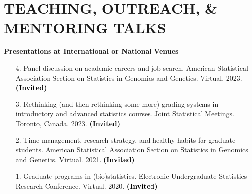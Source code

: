 \documentclass[margin]{res}
\newenvironment{benumerate}[1]{
    \let\oldItem\item
    \def\item{\addtocounter{enumi}{-2}\oldItem}
    
    \begin{enumerate}
    \setcounter{enumi}{#1}
    \addtocounter{enumi}{1}
}{
    \end{enumerate}
}
\newcommand{\annotate}[1]{\textcolor{black}{\textbf{(#1)}}}
\newcommand{\annotateItem}[1]{
	\begin{itemize} \vspace{-0.1cm}
	\item[] 
	\begin{footnotesize}\textcolor{black}{(#1)}\end{footnotesize}
	\end{itemize} \vspace{-0.1cm}
}
\begin{document}
\begin{resume}
\begin{itemize}
\end{itemize}




\section{TEACHING, OUTREACH, \& MENTORING  TALKS}

\textbf{Presentations at International or National Venues}

\begin{itemize}

\item[4.] Panel discussion on academic careers and job search. 
American Statistical Association Section on Statistics in Genomics and Genetics. Virtual. 2023. 
\annotate{Invited}

\item[3.] Rethinking (and then rethinking some more) grading systems in introductory and advanced statistics courses. 
Joint Statistical Meetings. Toronto, Canada. 2023. 
\annotate{Invited}

\item[2.] Time management, research strategy, and healthy habits for graduate students. 
American Statistical Association Section on Statistics in Genomics and Genetics. Virtual. 2021. 
\annotate{Invited}

\item[1.] Graduate programs in (bio)statistics. 
Electronic Undergraduate Statistics Research Conference. Virtual. 2020. 
\annotate{Invited}

\end{itemize}



\end{resume}
\end{document}
